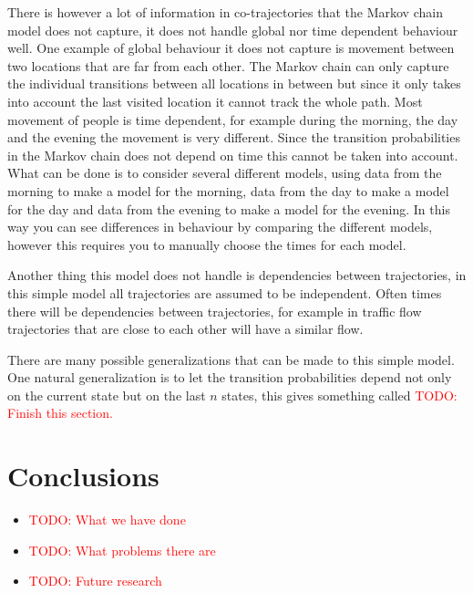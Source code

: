 \documentclass[12pt]{article}
\newcommand{\todo}[1]{\textcolor{red}{#1}}
\theoremstyle{definition}
\begin{document}
There is however a lot of information in co-trajectories that the
Markov chain model does not capture, it does not handle global nor
time dependent behaviour well. One example of global behaviour it does
not capture is movement between two locations that are far from each
other. The Markov chain can only capture the individual transitions
between all locations in between but since it only takes into account
the last visited location it cannot track the whole path. Most
movement of people is time dependent, for example during the morning,
the day and the evening the movement is very different. Since the
transition probabilities in the Markov chain does not depend on time
this cannot be taken into account. What can be done is to consider
several different models, using data from the morning to make a model
for the morning, data from the day to make a model for the day and
data from the evening to make a model for the evening. In this way you
can see differences in behaviour by comparing the different models,
however this requires you to manually choose the times for each model.

Another thing this model does not handle is dependencies between
trajectories, in this simple model all trajectories are assumed to be
independent. Often times there will be dependencies between
trajectories, for example in traffic flow trajectories that are close
to each other will have a similar flow.

There are many possible generalizations that can be made to this
simple model. One natural generalization is to let the transition
probabilities depend not only on the current state but on the last
\(n\) states, this gives something called \todo{TODO: Finish this
  section.}

\section{Conclusions}
\begin{itemize}
\item \todo{TODO: What we have done}
\item \todo{TODO: What problems there are}
\item \todo{TODO: Future research}
\end{itemize}



\end{document}
